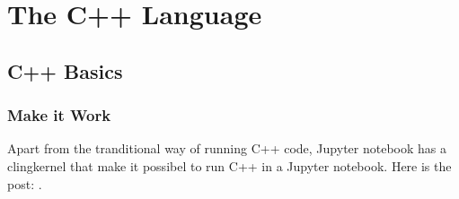 \documentclass[letterpaper,12pt,english]{sphinxmanual}
\begin{document}
\chapter{The C++ Language}
\label{\detokenize{cpp/index::doc}}\label{\detokenize{cpp/index:the-c-language}}

\section{C++ Basics}
\label{\detokenize{cpp/basics::doc}}\label{\detokenize{cpp/basics:c-basics}}

\subsection{Make it Work}
\label{\detokenize{cpp/basics:make-it-work}}
Apart from the tranditional way of running C++ code, Jupyter notebook has a clingkernel that make it possibel to run C++ in a Jupyter notebook. Here is the post: .
\end{document}
